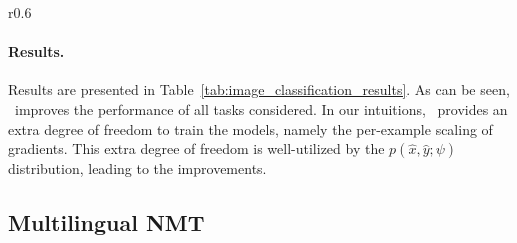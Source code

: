 \begin{wraptable}{r}{0.6\textwidth}
\vspace{-1cm}
\end{wraptable}

\paragraph{Results.} Results are presented in Table~\ref{tab:image_classification_results}. As can be seen, \dds~improves the performance of all tasks considered. In our intuitions, \dds~provides an extra degree of freedom to train the models, namely the per-example scaling of gradients. This extra degree of freedom is well-utilized by the $p(\hat{x}, \hat{y}; \psi)$ distribution, leading to the improvements.


\subsection{Multilingual NMT}
